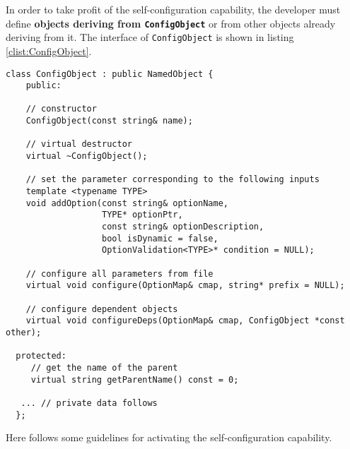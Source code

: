 \documentclass[11pt]{article}
\newcommand{\noi}{\noindent}
\begin{document}
In order to take profit of the self-configuration capability, 
the developer must define \textbf{objects deriving from \texttt{ConfigObject}} 
or from other objects already deriving from it. The interface of 
\texttt{ConfigObject} is shown in listing \ref{clist:ConfigObject}.     
\begin{lstlisting}[basicstyle={\small\sffamily},float=!htb,caption={ConfigObject interface.},
  label=clist:ConfigObject]
  class ConfigObject : public NamedObject {
    public: 
    
    // constructor
    ConfigObject(const string& name);
    
    // virtual destructor
    virtual ~ConfigObject();
    
    // set the parameter corresponding to the following inputs
    template <typename TYPE>
    void addOption(const string& optionName, 
                   TYPE* optionPtr, 
                   const string& optionDescription, 
                   bool isDynamic = false,
                   OptionValidation<TYPE>* condition = NULL);
    
    // configure all parameters from file
    virtual void configure(OptionMap& cmap, string* prefix = NULL);
    
    // configure dependent objects
    virtual void configureDeps(OptionMap& cmap, ConfigObject *const other);
    
  protected:
     // get the name of the parent
     virtual string getParentName() const = 0;

   ... // private data follows
  };
\end{lstlisting}
\noi
Here follows some guidelines for activating the self-configuration
capability.
\end{document}
